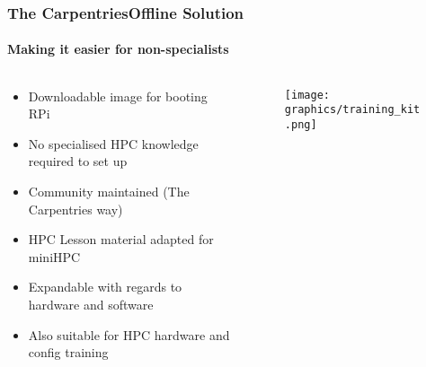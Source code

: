 \begin{frame}
	\frametitle{The CarpentriesOffline Solution}
	\framesubtitle{Making it easier for non-specialists}
	
	\begin{columns}
		\begin{column}[c]{.60\linewidth}
			\begin{itemize}[label={$\color{UmUBlue}\bullet$}]
				\item Downloadable image for booting RPi​
				\item No specialised HPC knowledge required to set up
				\item Community maintained (The Carpentries way)
				\item HPC Lesson material adapted for miniHPC
				\item Expandable with regards to hardware and software
				\item Also suitable for HPC hardware and config training
			\end{itemize}
		\end{column}
				
		\begin{column}[c]{.35\linewidth}
			\begin{figure}
				\texttt{[image: graphics/training\_kit.png]}
			\end{figure}
		\end{column}
	\end{columns}
\end{frame}